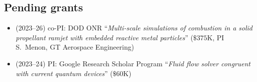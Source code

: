 \subsection{Pending grants}

\begin{itemize}
    \item (2023--26) co-PI: DOD ONR ``\textit{Multi-scale simulations of combustion in a solid propellant ramjet with embedded reactive metal particles}'' ($\$375$K, PI S.\ Menon, GT Aerospace Engineering)
    \item (2023--24) PI: Google Research Scholar Program ``\textit{Fluid flow solver congruent with current quantum devices}'' ($\$60$K)
\end{itemize}
